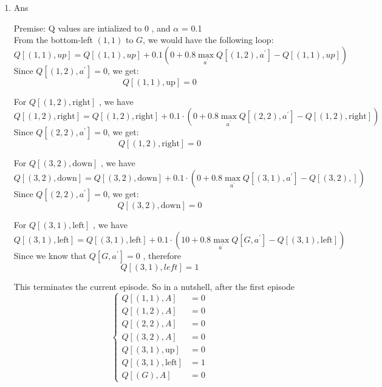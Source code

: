 \documentclass[12pt]{article}
\begin{document}
\begin{enumerate}
\begin{enumerate}
\begin{tcolorbox}
    \end{tcolorbox}
    \item Ans
    \begin{tcolorbox}
        Premise: Q values are intialized to \(0\) , and \(\alpha\) = 0.1\\
        From the bottom-left $(1,1)$ to $G$, we would have the following loop:
$$
Q[(1,1),up] = Q[(1,1), up] + 0.1 (0 + 0.8 \max_{a^{\prime}}Q[(1,2),a^{\prime}] - Q[(1,1),up])
$$
Since $Q[(1,2),a^{\prime}] = 0$, we get:
$$
Q[(1,1), \text{up}] = 0
$$

For $Q[(1,2),\text{right}]$ , we have
$$
Q[(1,2), \text{right}] =Q[(1,2), \text{right}] + 0.1 \cdot (0 + 0.8 \max_{a^{\prime}}Q[(2,2),a^{\prime}] - Q[(1,2), \text{right}])
$$
Since $Q[(2,2), a^{\prime}] = 0$, we get:
$$
Q[(1,2), \text{right}] = 0
$$

For $Q[(3,2),\text{down}]$ , we have
$$
Q[(3,2), \text{down}] =Q[(3,2), \text{down}] + 0.1 \cdot (0 + 0.8 \max_{a^{\prime}}Q[(3,1),a^{\prime}] - Q[(3,2), \text{}])
$$
Since $Q[(2,2), a^{\prime}] = 0$, we get:
$$
Q[(3,2), \text{down}] = 0
$$

For ${} Q[(3,1),\text{left}] {}$ , we have
$$
Q[(3,1), \text{left}] =Q[(3,1), \text{left}] + 0.1 \cdot (10 + 0.8 \max_{a^{\prime}}Q[G,a^{\prime}] - Q[(3,1), \text{left}])
$$
Since we know that $Q[G, a^{\prime}] = 0$ , therefore
$$
Q[(3,1),left] = 1
$$

This terminates the current episode.
So in a nutshell, after the first episode
$$
\begin{cases}
Q[(1,1),A] &= 0 \\
Q[(1,2),A] &= 0 \\
Q[(2,2),A] &= 0 \\
Q[(3,2),A] &= 0 \\
Q[(3,1),\text{up}]&= 0 \\
Q[(3,1),\text{left}]&=1 \\
Q[(G), A] &= 0
\end{cases}
$$


\end{tcolorbox}
\end{enumerate}
\end{enumerate}
\end{document}
